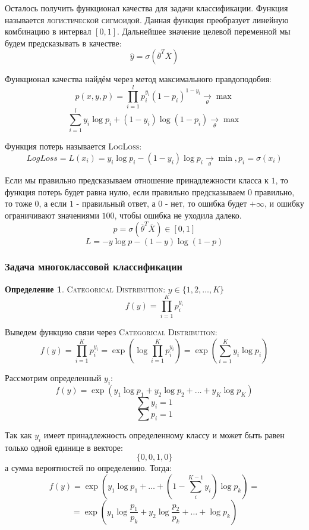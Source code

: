 \documentclass[%
10pt, %
final, %
oneside, %
onecolumn, %
centertags]{article} %
\theoremstyle{plain}
\theoremstyle{definition}
\newtheorem{definition}{Определение}[subsection] %
\theoremstyle{remark}
\begin{document}
Осталось получить функционал качества для задачи классификации. Функция называется \textsc{логистической сигмоидой}. Данная функция преобразует линейную комбинацию в интервал $[0,1]$. Дальнейшее значение целевой переменной мы будем предсказывать в качестве:
$$\hat{y} = \sigma\left(\overline{\theta}^T \overline{X}\right)$$

Функционал качества найдём через метод максимального правдоподобия:
$$p(x,y,p) = \prod\limits_{i=1}^l p_i^{y_i}(1-p_i)^{1-y_i} \xrightarrow[\theta]{}\max $$
$$\sum\limits_{i=1}^l y_i \log p_i + (1-y_i)\log(1-p_i)  \xrightarrow[\theta]{}\max$$

Функция потерь называется \textsc{LogLoss}:
$$LogLoss = L(x_i) = y_i \log p_i - (1-y_i)\log p_i  \xrightarrow[\theta]{}\min, p_i = \sigma(x_i)$$

Если мы правильно предсказываем отношение принадлежности класса к $1$, то функция потерь будет равна нулю, если правильно предсказываем $0$ правильно, то тоже $0$, а если $1$ - правильный ответ, а $0$ - нет, то ошибка будет $+\infty$, и ошибку ограничивают значениями $100$, чтобы ошибка не уходила далеко.
$$p = \sigma\left(\overline{\theta}^T \overline{X}\right) \in [0,1]$$
$$L = -y\log p - (1-y)\log(1-p)$$

\subsubsection{Задача многоклассовой классификации}

\begin{definition}
	\textsc{Categorical Distribution}: $y \in \{1,2,\ldots,K\}$
	$$f(y) = \prod\limits_{i=1}^K p_i^{y_i}$$
\end{definition}

Выведем функцию связи через \textsc{Categorical Distribution}:
$$f(y) = \prod\limits_{i=1}^K p_i^{y_i} = \exp (\log \prod\limits_{i=1}^K p_i^{y_i}) = \exp (\sum\limits_{i=1}^K y_i \log p_i)$$

Рассмотрим определенный $y_i$:
$$f(y) = \exp(y_1\log p_1 + y_2\log p_2 + \ldots + y_K\log p_K)$$
$$\sum\limits y_i = 1$$
$$\sum\limits p_i = 1$$

Так как $y_i$ имеет принадлежность определенному классу и может быть равен только одной единице в векторе:
$$\{0,0,1,0\}$$
а сумма вероятностей по определению. Тогда:
$$f(y) = \exp(y_1\log p_1 + \ldots + \left(1-\sum\limits_{i}^{K-1}y_i\right)\log p_k) = $$
$$ = \exp\left(y_1 \log \frac{p_1}{p_k} + y_2 \log \frac{p_2}{p_k} + \ldots + \log p_k \right)$$
\end{document}
